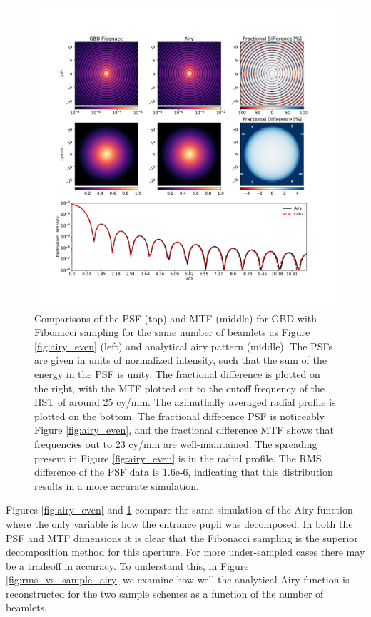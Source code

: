 \begin{figure}[H]
    \centering
    \includegraphics[width=\textwidth]{Airy_compare_Fib.pdf}
    \caption{Comparisons of the PSF (top) and MTF (middle) for GBD with Fibonacci sampling for the same number of beamlets as Figure \ref{fig:airy_even} (left) and analytical airy pattern (middle). The PSFs are given in units of normalized intensity, such that the sum of the energy in the PSF is unity. The fractional difference is plotted on the right, with the MTF plotted out to the cutoff frequency of the HST of around 25 cy/mm. The azimuthally averaged radial profile is plotted on the bottom. The  fractional difference PSF is noticeably  Figure \ref{fig:airy_even}, and the fractional difference MTF shows that frequencies out to 23 cy/mm are well-maintained. The spreading present in Figure \ref{fig:airy_even} is  in the radial profile. The RMS difference of the PSF data is 1.6e-6, indicating that this distribution results in a more accurate simulation.}
    \label{fig:airy_fib}
\end{figure}

Figures \ref{fig:airy_even} and \ref{fig:airy_fib} compare the same simulation of the Airy function where the only variable is how the entrance pupil was decomposed. In both the PSF and MTF dimensions it is clear that the Fibonacci sampling is the superior decomposition method for this aperture. For more under-sampled cases there may be a tradeoff in accuracy. To understand this, in Figure \ref{fig:rms_vs_sample_airy} we examine how well the analytical Airy function is reconstructed for the two sample schemes as a function of the number of beamlets.

